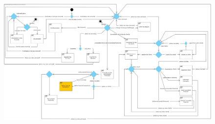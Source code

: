 \documentclass[../rapport.tex]{subfiles}
\begin{document}
\begin{figure}[H]
    \includegraphics[scale=0.188]{ressources/photos_diagrammes/extensionUgo/interactionOverviewDiagramApp2.jpg}
\end{figure}

\newpage
\end{document}
